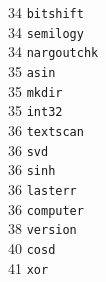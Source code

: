 \begin{footnotesize}
\begin{multicols}{3}
\vspace{-.153cm} 34    \hspace{.2cm} {\tt bitshift            }    \\ %
\vspace{-.153cm} 34    \hspace{.2cm} {\tt semilogy            }    \\ %
\vspace{-.153cm} 34    \hspace{.2cm} {\tt nargoutchk          }    \\ %
\vspace{-.153cm} 35    \hspace{.2cm} {\tt asin                }    \\ %
\vspace{-.153cm} 35    \hspace{.2cm} {\tt mkdir               }    \\ %
\vspace{-.153cm} 35    \hspace{.2cm} {\tt int32               }    \\ %
\vspace{-.153cm} 36    \hspace{.2cm} {\tt textscan            }    \\ %
\vspace{-.153cm} 36    \hspace{.2cm} {\tt svd                 }    \\ %
\vspace{-.153cm} 36    \hspace{.2cm} {\tt sinh                }    \\ %
\vspace{-.153cm} 36    \hspace{.2cm} {\tt lasterr             }    \\ %
\vspace{-.153cm} 36    \hspace{.2cm} {\tt computer            }    \\ %
\vspace{-.153cm} 38    \hspace{.2cm} {\tt version             }    \\ %
\vspace{-.153cm} 40    \hspace{.2cm} {\tt cosd                }    \\ %
\vspace{-.153cm} 41    \hspace{.2cm} {\tt xor                 }    \\ %

\end{multicols}
\end{footnotesize}
